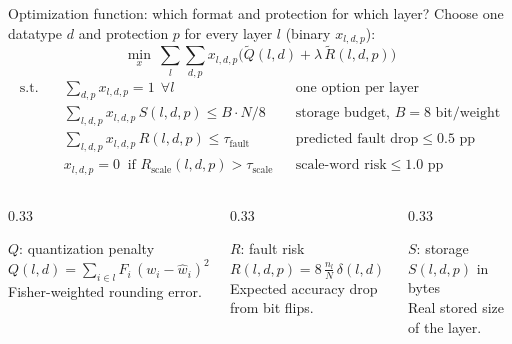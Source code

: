 \documentclass[aspectratio=169,10pt]{beamer}
\begin{document}
\begin{frame}{Optimization function: which format and protection for which layer?}
  Choose one datatype $d$ and protection $p$ for every layer $l$ (binary $x_{l,d,p}$):
  \[
    \min_{x}\ \sum_{l}\sum_{d,p} x_{l,d,p}\Big(\widetilde{Q}(l,d)+\lambda\,\widetilde{R}(l,d,p)\Big)
  \]
  \vspace{-5mm}
  \begin{align*}
    \text{s.t.}\quad & \textstyle\sum_{d,p} x_{l,d,p}=1\ \ \forall l && \text{one option per layer}\\
    & \textstyle\sum_{l,d,p} x_{l,d,p}\,S(l,d,p)\le B\cdot N/8 && \text{storage budget, } B=8\text{ bit/weight}\\
    & \textstyle\sum_{l,d,p} x_{l,d,p}\,R(l,d,p)\le \tau_{\text{fault}} && \text{predicted fault drop} \le 0.5\text{ pp}\\
    & x_{l,d,p}=0\ \text{ if } R_{\text{scale}}(l,d,p)>\tau_{\text{scale}} && \text{scale-word risk} \le 1.0\text{ pp}
  \end{align*}
  \vspace{-2mm}
  \begin{columns}[T]
    \begin{column}{0.33\textwidth}
      \begin{block}{$Q$: quantization penalty}
        \small
        $Q(l,d)=\sum_{i\in l}F_i\,(w_i-\hat w_i)^2$\\[1mm]
        Fisher-weighted rounding error.
      \end{block}
    \end{column}
    \begin{column}{0.33\textwidth}
      \begin{block}{$R$: fault risk}
        \small
        $R(l,d,p)=8\,\tfrac{n_l}{N}\,\delta(l,d)\,\rho(p)$\\[1mm]
        Expected accuracy drop from bit flips.
      \end{block}
    \end{column}
    \begin{column}{0.33\textwidth}
      \begin{block}{$S$: storage}
        \small
        $S(l,d,p)$ in bytes\\[1mm]
        Real stored size of the layer.
      \end{block}
    \end{column}
  \end{columns}
\end{frame}
\end{document}
